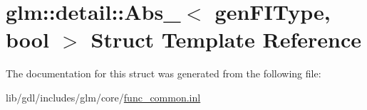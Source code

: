 \hypertarget{structglm_1_1detail_1_1_abs__}{}\section{glm\+:\+:detail\+:\+:Abs\+\_\+$<$ gen\+F\+I\+Type, bool $>$ Struct Template Reference}
\label{structglm_1_1detail_1_1_abs__}


The documentation for this struct was generated from the following file\+:\begin{DoxyCompactItemize}
\item 
lib/gdl/includes/glm/core/\hyperlink{func__common_8inl}{func\+\_\+common.\+inl}\end{DoxyCompactItemize}
